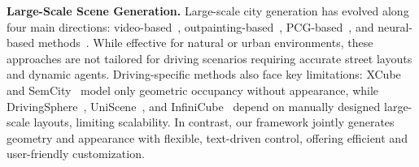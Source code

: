\noindent\textbf{Large-Scale Scene Generation.}
Large-scale city generation has evolved along four main directions: video-based~\cite{InfiniteNature, Streetscape}, outpainting-based~\cite{LucidDreamer, WonderWorld, WonderJourney}, PCG-based~\cite{SceneX, CityCraft, CityX}, and neural-based methods~\cite{InfiniCity, CityDreamer, GaussianCity}. While effective for natural or urban environments, these approaches are not tailored for driving scenarios requiring accurate street layouts and dynamic agents.
Driving-specific methods also face key limitations: XCube~\cite{XCube} and SemCity~\cite{SemCity} model only geometric occupancy without appearance, while DrivingSphere~\cite{DrivingSphere}, UniScene~\cite{UniScene}, and InfiniCube~\cite{InfiniCube} depend on manually designed large-scale layouts, limiting scalability.
In contrast, our {\method} framework jointly generates geometry and appearance with flexible, text-driven control, offering efficient and user-friendly customization.